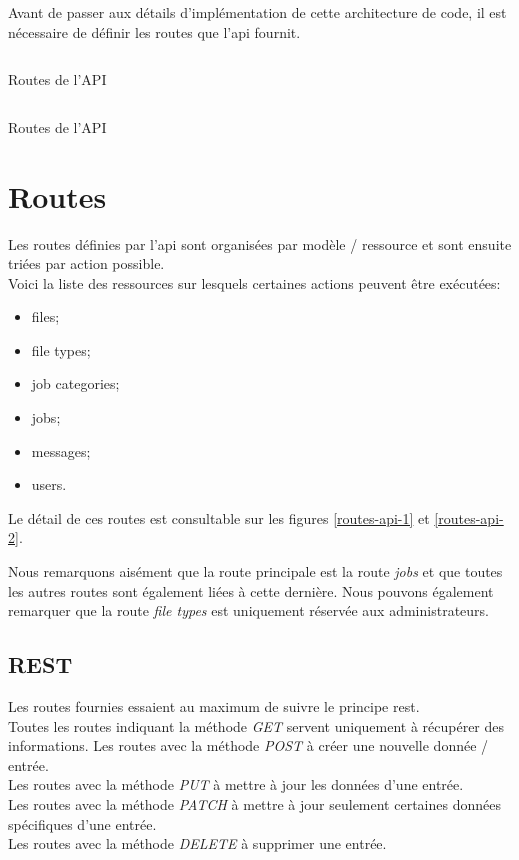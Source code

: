 \documentclass[
    iai, %
    il, %
]{heig-tb}
\begin{document}
Avant de passer aux détails d'implémentation de cette architecture de code, il est nécessaire de définir les routes que l'\Gls{api} fournit.

\begin{listing}[H]
    \inputminted{php}{assets/code/api-1.php}
    \caption{Routes de l'API \label{routes-api-2}}
\end{listing}

\begin{listing}[H]
    \inputminted{php}{assets/code/api-2.php}
    \caption{Routes de l'API \label{routes-api-1}}
\end{listing}

\newpage

\section{Routes}

Les routes définies par l'\Gls{api} sont organisées par modèle / ressource et sont ensuite triées par action possible. \\
Voici la liste des ressources sur lesquels certaines actions peuvent être exécutées:
\begin{itemize}
    \item files;
    \item file types;
    \item job categories;
    \item jobs;
    \item messages;
    \item users.
\end{itemize}

Le détail de ces routes est consultable sur les figures \ref{routes-api-1} et \ref{routes-api-2}.

Nous remarquons aisément que la route principale est la route \emph{jobs} et que toutes les autres routes sont également liées à cette dernière. Nous pouvons également remarquer que la route \emph{file types} est uniquement réservée aux administrateurs.

\subsection{REST}
Les routes fournies essaient au maximum de suivre le principe \Gls{rest}. \\
Toutes les routes indiquant la méthode \emph{GET} servent uniquement à récupérer des informations.
Les routes avec la méthode \emph{POST} à créer une nouvelle donnée / entrée. \\
Les routes avec la méthode \emph{PUT} à mettre à jour les données d'une entrée. \\
Les routes avec la méthode \emph{PATCH} à mettre à jour seulement certaines données spécifiques d'une entrée. \\
Les routes avec la méthode \emph{DELETE} à supprimer une entrée.
\end{document}
